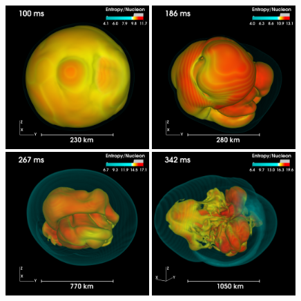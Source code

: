 \begin{figure}[ht]         
\centering                            
\includegraphics[width=0.49\textwidth]{./images/paper2/m15fr1.png}
\includegraphics[width=0.49\textwidth]{./images/paper2/m15fr2.png} \\
\includegraphics[width=0.49\textwidth]{./images/paper2/m15fr3.png}
\includegraphics[width=0.49\textwidth]{./images/paper2/m15fr4.png}

\end{figure}
